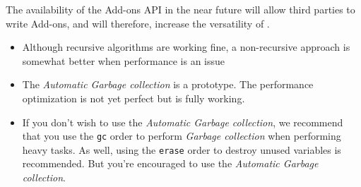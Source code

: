 The availability of the \squirrel Add-ons API in the near future will allow third parties to write Add-ons, and will therefore, increase the versatility of \squirrel.

\begin{itemize}
\item Although recursive algorithms are working fine, a non-recursive approach is somewhat better when performance is an issue
\item The {\em Automatic Garbage collection} is a prototype. The performance optimization is not yet perfect but is fully working.
\item If you don't wish to use the {\em Automatic Garbage collection}, we recommend that you use the {\tt gc} order to perform {\em Garbage collection} when performing heavy tasks. As well, using the {\tt erase} order to destroy unused variables is recommended. But you're encouraged to use the {\em Automatic Garbage collection}.
\end{itemize} 
